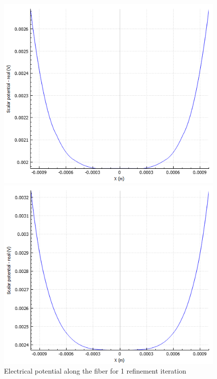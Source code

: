 \documentclass{article}
\begin{document}
    \begin{figure}[htbp]
        \centering
        \begin{minipage}[b]{0.3\textwidth}
            \includegraphics[width=\textwidth]{FE_efield_along_fiber_1}
            \caption{Electrical potential along the fiber for 1 refinement iteration}
            \label{fig:FE_efield_along_fiber_1_1}
        \end{minipage}
        \hfill
        \begin{minipage}[b]{0.3\textwidth}
            \includegraphics[width=\textwidth]{FE_efield_along_fiber_2}

\end{minipage}
\end{figure}
\end{document}
